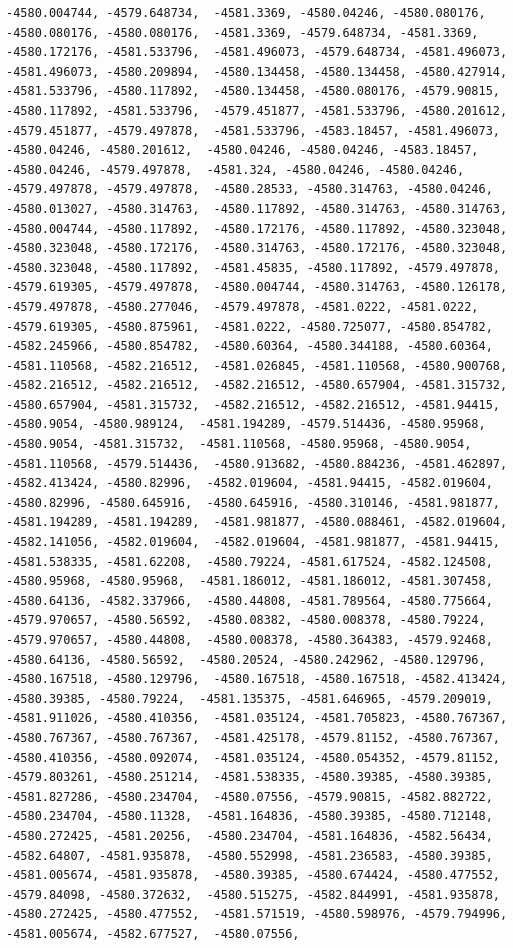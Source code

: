 \documentclass[
]{article}
\begin{document}
\begin{verbatim}
-4580.004744, -4579.648734,  -4581.3369, -4580.04246, -4580.080176, -4580.080176, -4580.080176,  -4581.3369, -4579.648734, -4581.3369, -4580.172176, -4581.533796,  -4581.496073, -4579.648734, -4581.496073, -4581.496073, -4580.209894,  -4580.134458, -4580.134458, -4580.427914, -4581.533796, -4580.117892,  -4580.134458, -4580.080176, -4579.90815, -4580.117892, -4581.533796,  -4579.451877, -4581.533796, -4580.201612, -4579.451877, -4579.497878,  -4581.533796, -4583.18457, -4581.496073, -4580.04246, -4580.201612,  -4580.04246, -4580.04246, -4583.18457, -4580.04246, -4579.497878,  -4581.324, -4580.04246, -4580.04246, -4579.497878, -4579.497878,  -4580.28533, -4580.314763, -4580.04246, -4580.013027, -4580.314763,  -4580.117892, -4580.314763, -4580.314763, -4580.004744, -4580.117892,  -4580.172176, -4580.117892, -4580.323048, -4580.323048, -4580.172176,  -4580.314763, -4580.172176, -4580.323048, -4580.323048, -4580.117892,  -4581.45835, -4580.117892, -4579.497878, -4579.619305, -4579.497878,  -4580.004744, -4580.314763, -4580.126178, -4579.497878, -4580.277046,  -4579.497878, -4581.0222, -4581.0222, -4579.619305, -4580.875961,  -4581.0222, -4580.725077, -4580.854782, -4582.245966, -4580.854782,  -4580.60364, -4580.344188, -4580.60364, -4581.110568, -4582.216512,  -4581.026845, -4581.110568, -4580.900768, -4582.216512, -4582.216512,  -4582.216512, -4580.657904, -4581.315732, -4580.657904, -4581.315732,  -4582.216512, -4582.216512, -4581.94415, -4580.9054, -4580.989124,  -4581.194289, -4579.514436, -4580.95968, -4580.9054, -4581.315732,  -4581.110568, -4580.95968, -4580.9054, -4581.110568, -4579.514436,  -4580.913682, -4580.884236, -4581.462897, -4582.413424, -4580.82996,  -4582.019604, -4581.94415, -4582.019604, -4580.82996, -4580.645916,  -4580.645916, -4580.310146, -4581.981877, -4581.194289, -4581.194289,  -4581.981877, -4580.088461, -4582.019604, -4582.141056, -4582.019604,  -4582.019604, -4581.981877, -4581.94415, -4581.538335, -4581.62208,  -4580.79224, -4581.617524, -4582.124508, -4580.95968, -4580.95968,  -4581.186012, -4581.186012, -4581.307458, -4580.64136, -4582.337966,  -4580.44808, -4581.789564, -4580.775664, -4579.970657, -4580.56592,  -4580.08382, -4580.008378, -4580.79224, -4579.970657, -4580.44808,  -4580.008378, -4580.364383, -4579.92468, -4580.64136, -4580.56592,  -4580.20524, -4580.242962, -4580.129796, -4580.167518, -4580.129796,  -4580.167518, -4580.167518, -4582.413424, -4580.39385, -4580.79224,  -4581.135375, -4581.646965, -4579.209019, -4581.911026, -4580.410356,  -4581.035124, -4581.705823, -4580.767367, -4580.767367, -4580.767367,  -4581.425178, -4579.81152, -4580.767367, -4580.410356, -4580.092074,  -4581.035124, -4580.054352, -4579.81152, -4579.803261, -4580.251214,  -4581.538335, -4580.39385, -4580.39385, -4581.827286, -4580.234704,  -4580.07556, -4579.90815, -4582.882722, -4580.234704, -4580.11328,  -4581.164836, -4580.39385, -4580.712148, -4580.272425, -4581.20256,  -4580.234704, -4581.164836, -4582.56434, -4582.64807, -4581.935878,  -4580.552998, -4581.236583, -4580.39385, -4581.005674, -4581.935878,  -4580.39385, -4580.674424, -4580.477552, -4579.84098, -4580.372632,  -4580.515275, -4582.844991, -4581.935878, -4580.272425, -4580.477552,  -4581.571519, -4580.598976, -4579.794996, -4581.005674, -4582.677527,  -4580.07556, 
\end{verbatim}
\end{document}
